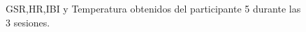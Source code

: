 \begin{figure}[h]
        \centering
        \caption{GSR,HR,IBI y Temperatura obtenidos del participante 5 durante las 3 sesiones.}\label{fig:data_p5}
\end{figure}
\pagebreak

